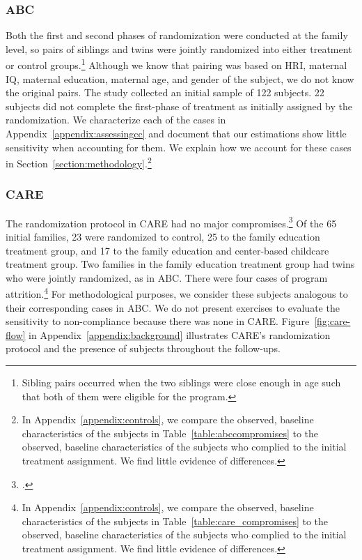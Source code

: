 \subsubsection{ABC}

\noindent Both the first and second phases of randomization were conducted at the family level, so pairs of siblings and twins were jointly randomized into either treatment or control groups.\footnote{Sibling pairs occurred when the two siblings were close enough in age such that both of them were eligible for the program.} Although we know that pairing was based on HRI, maternal IQ, maternal education, maternal age, and gender of the subject, we do not know the original pairs. The study collected an initial sample of 122 subjects. 22 subjects did not complete the first-phase of treatment as initially assigned by the randomization. We characterize each of the cases in Appendix~\ref{appendix:assessingcc} and document that our estimations show little sensitivity when accounting for them. We explain how we account for these cases in Section~\ref{section:methodology}.\footnote{In Appendix~\ref{appendix:controls}, we compare the observed, baseline characteristics of the subjects in Table~\ref{table:abccompromises} to the observed, baseline characteristics of the subjects who complied to the initial treatment assignment. We find little evidence of differences.}\\

\subsubsection{CARE}

\noindent The randomization protocol in CARE had no major compromises.\footnote{\citet{Wasik_Ramey_etal_1990_CD,Burchinal_Campbell_etal_1997_CD}.} Of the 65 initial families, 23 were randomized to control, 25 to the family education treatment group, and 17 to the family education and center-based childcare treatment group. Two families in the family education treatment group had twins who were jointly randomized, as in ABC. There were four cases of program attrition.\footnote{In Appendix~\ref{appendix:controls}, we compare the observed, baseline characteristics of the subjects in Table~\ref{table:care_compromises} to the observed, baseline characteristics of the subjects who complied to the initial treatment assignment. We find little evidence of differences.} For methodological purposes, we consider these subjects analogous to their corresponding cases in ABC. We do not present exercises to evaluate the sensitivity to non-compliance because there was none in CARE. Figure~\ref{fig:care-flow} in Appendix~\ref{appendix:background} illustrates CARE's randomization protocol and the presence of subjects throughout the follow-ups.\\

